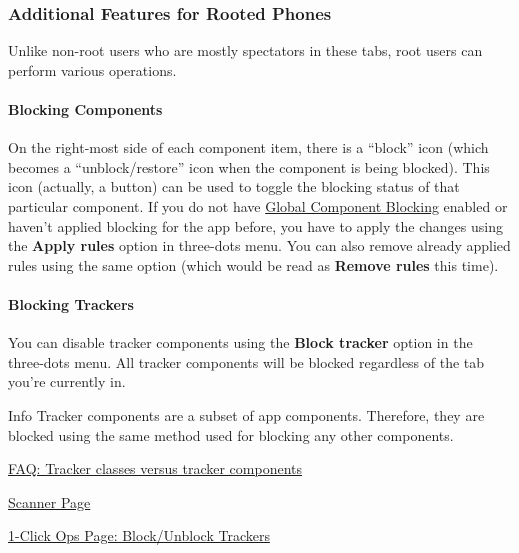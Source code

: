 \subsubsection{Additional Features for Rooted Phones}
Unlike non-root users who are mostly spectators in these tabs, root users can perform various operations.

\paragraph{Blocking Components}
On the right-most side of each component item, there is a ``block'' icon (which becomes a ``unblock/restore'' icon when
the component is being blocked). This icon (actually, a button) can be used to toggle the blocking status of that
particular component. If you do not have \hyperref[subsubsec:instant-component-blocking]{Global Component Blocking}
enabled or haven't applied blocking for the app before, you have to apply the changes using the \textbf{Apply rules}
option in three-dots menu. You can also remove already applied rules using the same option (which would be read as
\textbf{Remove rules} this time).


\paragraph{Blocking Trackers}
\label{par:appdetails:blocking-trackers}
You can disable tracker components using the \textbf{Block tracker} option in the three-dots menu. All tracker
components will be blocked regardless of the tab you're currently in.

\begin{tip}{Info}
    Tracker components are a subset of app components. Therefore, they are blocked using the same method used for
    blocking any other components.
\end{tip}

\begin{amseealso}
    \item \hyperref[subsec:tracker-classes-versus-tracker-components]{FAQ: Tracker classes versus tracker components}
    \item \hyperref[sec:scanner-page]{Scanner Page}
    \item \hyperref[subsec:block-unblock-trackers]{1-Click Ops Page: Block/Unblock Trackers}
\end{amseealso}

